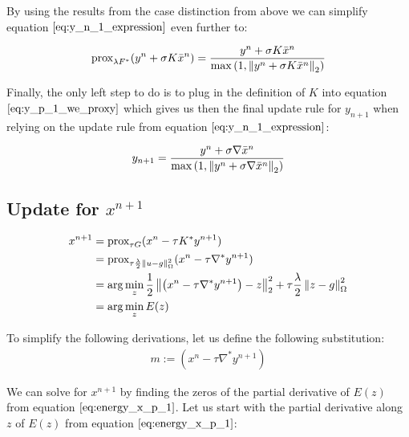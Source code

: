 By using the results from the case distinction from above we can simplify equation $\ref{eq:y_n_1_expression}$ even further to:

\begin{equation}
	\text{prox}_{\lambda F^*}(y^n + \sigma K \bar{x}^{n}) = \frac{y^n + \sigma K \bar{x}^{n}}{\max{\left(1,\left\lVert y^n + \sigma K \bar{x}^{n}\right\rVert_2 \right)}}
\label{eq:y_p_1_we_proxy}	
\end{equation}

Finally, the only left step to do is to plug in the definition of $K$ into equation $\ref{eq:y_p_1_we_proxy}$ which gives us then the final update rule for $y_{n+1}$ when relying on the update rule from equation $\ref{eq:y_n_1_expression}$:

\begin{align}
	y_{n+1} = \frac{y^n + \sigma \nabla \bar{x}^{n}}{\max{\left(1,\left\lVert y^n + \sigma \nabla \bar{x}^{n}\right\rVert_2 \right)}}
\label{eq:update_rule_y_n_p_1}	
\end{align} 	

\subsection{Update for $x^{n+1}$}

\begin{align}
x^{n+1} &= \text{prox}_{\tau G}(x^n - \tau K^* y^{n+1}) \\
		&= \text{prox}_{\tau \frac{\lambda}{2} \left\lVert u - g\right\rVert_{\Omega}^2 }(x^n - \tau \nabla^* y^{n+1}) \\
	    &= \arg \min_{z} \frac{1}{2} \left\lVert\left(x^n - \tau \nabla^* y^{n+1} \right) - z\right\rVert_2^2 + \tau \frac{\lambda}{2}\left\lVert z - g\right\rVert_{\Omega}^2 \\
	    &= \arg \min_{z} E(z)
\label{eq:energy_x_p_1}	    
\end{align}

To simplify the following derivations, let us define the following substitution: 
\begin{align}
	m := \left(x^n - \tau \nabla^* y^{n+1} \right)
\end{align}

We can solve for $x^{n+1}$ by finding the zeros of the partial derivative of $E(z)$ from equation $\ref{eq:energy_x_p_1}$. Let us start with the partial derivative along $z$ of $E(z)$ from equation $\ref{eq:energy_x_p_1}$: 

